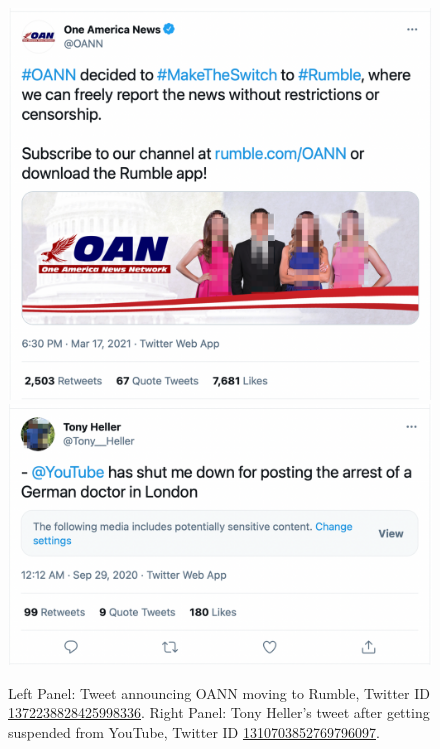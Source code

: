 \documentclass{article}
\begin{document}
\begin{figure}[h]
	\centering
		\includegraphics[scale=0.21]{./img/oann/fig3_oann.png}
		\includegraphics[scale=0.31]{./img/tony/fig3_tony.png}
	\caption{Left Panel: Tweet announcing OANN moving to Rumble, Twitter ID \href{https://twitter.com/OANN/status/1372238828425998336}{1372238828425998336}. Right Panel: Tony Heller's tweet after getting suspended from YouTube, Twitter ID \href{https://twitter.com/Tony\_Heller/status/1310703852769796097}{1310703852769796097}.}
	\label{tweets_about_yt_suspensions}
\end{figure}

\smallskip
\end{document}
